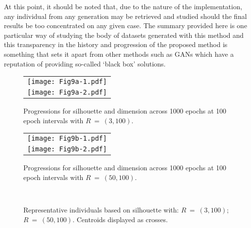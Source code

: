 At this point, it should be noted that, due to the nature of the implementation,
any individual from any generation may be retrieved and studied should the final
results be too concentrated on any given case. The summary provided here is one
particular way of studying the body of datasets generated with this method and
this transparency in the history and progression of the proposed method is
something that sets it apart from other methods such as GANs which have a
reputation of providing so-called `black box' solutions.

\addtocounter{figure}{1}
\begin{figure}[htbp]
    \ContinuedFloat%
    \centering
    \begin{tabular}{c}
        \texttt{[image: Fig9a-1.pdf]}
        \\
        \texttt{[image: Fig9a-2.pdf]}
    \end{tabular}
    \caption{%
        Progressions for silhouette and dimension across 1000 epochs at 100
        epoch intervals with \(R~=~(3, 100)\).
    }\label{fig:small-silhouette}
\end{figure}

\begin{figure}
    \ContinuedFloat%
    \centering
    \begin{tabular}{c}
        \texttt{[image: Fig9b-1.pdf]}
        \\
        \texttt{[image: Fig9b-2.pdf]}
    \end{tabular}
    \caption{%
        Progressions for silhouette and dimension across 1000 epochs at 100
        epoch intervals with \(R~=~(50,100)\).
    }\label{fig:large-silhouette}
\end{figure}

\begin{figure}[htbp]
    \centering
    \\

    \caption[]{%
        Representative individuals based on silhouette with:
         \(R~=~(3,100)\);
         \(R~=~(50,100)\). Centroids displayed
        as crosses.
    }\label{fig:silhouette-inds}
\end{figure}

